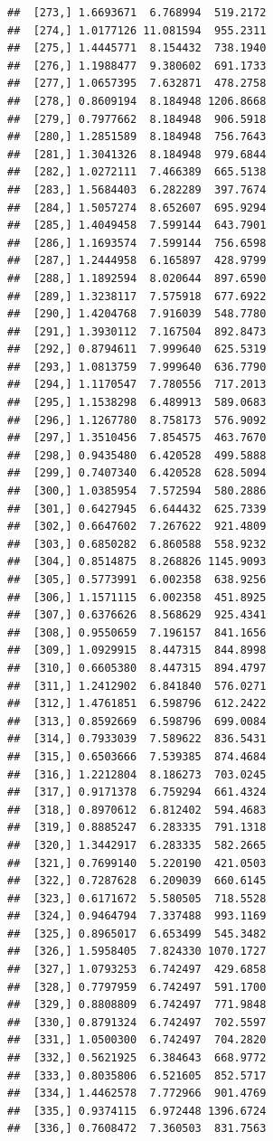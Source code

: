 \documentclass[article]{jss}\usepackage[]{graphicx}\usepackage[]{xcolor}
\makeatletter
\newenvironment{kframe}{%
 \def\at@end@of@kframe{}%
 \ifinner\ifhmode%
  \def\at@end@of@kframe{\end{minipage}}%
  \begin{minipage}{\columnwidth}%
 \fi\fi%
 \def\FrameCommand##1{\hskip\@totalleftmargin \hskip-\fboxsep
 \colorbox{shadecolor}{##1}\hskip-\fboxsep
     \hskip-\linewidth \hskip-\@totalleftmargin \hskip\columnwidth}%
 \MakeFramed {\advance\hsize-\width
   \@totalleftmargin\z@ \linewidth\hsize
   \@setminipage}}%
 {\par\unskip\endMakeFramed%
 \at@end@of@kframe}
\newenvironment{knitrout}{}{} %
\makeatother
\begin{document}
\begin{knitrout}
\begin{kframe}
\begin{verbatim}
##  [273,] 1.6693671  6.768994  519.2172
##  [274,] 1.0177126 11.081594  955.2311
##  [275,] 1.4445771  8.154432  738.1940
##  [276,] 1.1988477  9.380602  691.1733
##  [277,] 1.0657395  7.632871  478.2758
##  [278,] 0.8609194  8.184948 1206.8668
##  [279,] 0.7977662  8.184948  906.5918
##  [280,] 1.2851589  8.184948  756.7643
##  [281,] 1.3041326  8.184948  979.6844
##  [282,] 1.0272111  7.466389  665.5138
##  [283,] 1.5684403  6.282289  397.7674
##  [284,] 1.5057274  8.652607  695.9294
##  [285,] 1.4049458  7.599144  643.7901
##  [286,] 1.1693574  7.599144  756.6598
##  [287,] 1.2444958  6.165897  428.9799
##  [288,] 1.1892594  8.020644  897.6590
##  [289,] 1.3238117  7.575918  677.6922
##  [290,] 1.4204768  7.916039  548.7780
##  [291,] 1.3930112  7.167504  892.8473
##  [292,] 0.8794611  7.999640  625.5319
##  [293,] 1.0813759  7.999640  636.7790
##  [294,] 1.1170547  7.780556  717.2013
##  [295,] 1.1538298  6.489913  589.0683
##  [296,] 1.1267780  8.758173  576.9092
##  [297,] 1.3510456  7.854575  463.7670
##  [298,] 0.9435480  6.420528  499.5888
##  [299,] 0.7407340  6.420528  628.5094
##  [300,] 1.0385954  7.572594  580.2886
##  [301,] 0.6427945  6.644432  625.7339
##  [302,] 0.6647602  7.267622  921.4809
##  [303,] 0.6850282  6.860588  558.9232
##  [304,] 0.8514875  8.268826 1145.9093
##  [305,] 0.5773991  6.002358  638.9256
##  [306,] 1.1571115  6.002358  451.8925
##  [307,] 0.6376626  8.568629  925.4341
##  [308,] 0.9550659  7.196157  841.1656
##  [309,] 1.0929915  8.447315  844.8998
##  [310,] 0.6605380  8.447315  894.4797
##  [311,] 1.2412902  6.841840  576.0271
##  [312,] 1.4761851  6.598796  612.2422
##  [313,] 0.8592669  6.598796  699.0084
##  [314,] 0.7933039  7.589622  836.5431
##  [315,] 0.6503666  7.539385  874.4684
##  [316,] 1.2212804  8.186273  703.0245
##  [317,] 0.9171378  6.759294  661.4324
##  [318,] 0.8970612  6.812402  594.4683
##  [319,] 0.8885247  6.283335  791.1318
##  [320,] 1.3442917  6.283335  582.2665
##  [321,] 0.7699140  5.220190  421.0503
##  [322,] 0.7287628  6.209039  660.6145
##  [323,] 0.6171672  5.580505  718.5528
##  [324,] 0.9464794  7.337488  993.1169
##  [325,] 0.8965017  6.653499  545.3482
##  [326,] 1.5958405  7.824330 1070.1727
##  [327,] 1.0793253  6.742497  429.6858
##  [328,] 0.7797959  6.742497  591.1700
##  [329,] 0.8808809  6.742497  771.9848
##  [330,] 0.8791324  6.742497  702.5597
##  [331,] 1.0500300  6.742497  704.2820
##  [332,] 0.5621925  6.384643  668.9772
##  [333,] 0.8035806  6.521605  852.5717
##  [334,] 1.4462578  7.772966  901.4769
##  [335,] 0.9374115  6.972448 1396.6724
##  [336,] 0.7608472  7.360503  831.7563

\end{verbatim}
\end{kframe}
\end{knitrout}
\end{document}
